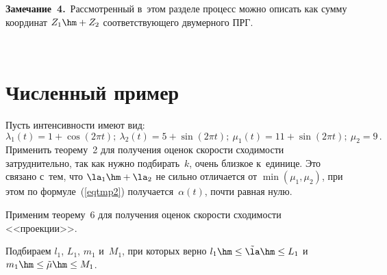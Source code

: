 \smallskip

\noindent
\textbf{Замечание~4.}\ Рассмотренный в~этом разделе процесс можно
 описать как сумму координат $Z_1\hm+Z_2$ соответствующего двумерного ПРГ.
 
 \begin{figure} %
\vspace*{1pt}
\begin{center}
 \mbox{%
 \epsfxsize=128.014mm 
 }
 \end{center}
\vspace*{-13pt}
\begin{minipage}[t]{63mm}
    \label{ftwotrebp0}    
    \end{minipage}
\hfill
\vspace*{-13pt}
\begin{minipage}[t]{63mm}
    \label{ftwotrebmu1}
    \end{minipage}
\end{figure}


\section{Численный пример}
\label{chpr}

Пусть интенсивности имеют вид:
 $$
 \lambda_1(t)=1+\cos (2\pi t);\ \lambda_2(t)
=5+\sin (2\pi t);\ \mu_1(t)=11+\sin (2\pi t);\ \mu_2=9\,.
$$
%
Применить теорему~2 для получения оценок скорости сходимости затруднительно, 
так как нужно подбирать~$k$, очень близкое к~единице. Это связано с~тем, что $\la_1\hm+\la_2$ 
не сильно отличается от $\min(\mu_1,\mu_2)$, при этом по  формуле~(\ref{eqtmp2}) получается~$\alpha(t)$, 
почти равная нулю.

Применим теорему~6 для получения оценок скорости сходимости <<проекции>>.

Подбираем $l_1$, $L_1$, $m_1$ и~$M_1$, при которых верно   $l_1\hm\le\tilde{\la}
\hm\le L_1$ и~$m_1\hm\le \tilde{\mu}\hm\le M_1$.

